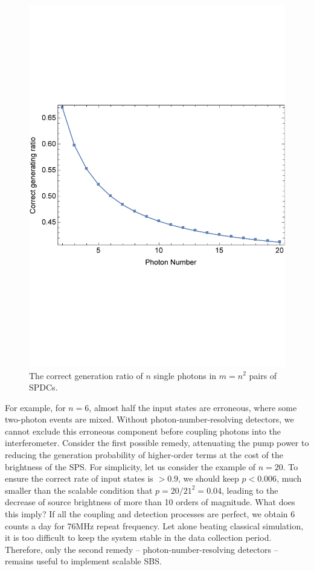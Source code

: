\documentclass[aps,rmp,twocolumn,amsmath,amssymb,nofootinbib,superscriptaddress]{revtex4}
\begin{document}
\begin{figure}[!htb]
\includegraphics[width=\columnwidth]{SBS_pair_gen}
\caption{The correct generation ratio of $n$ single photons in \mbox{$m=n^2$} pairs of SPDCs.} \label{fig:SBS_pair_gen}
\end{figure}

For example, for $n=6$, almost half the input states are erroneous, where some two-photon events are mixed. Without photon-number-resolving detectors, we cannot exclude this erroneous component before coupling photons into the interferometer. Consider the first possible remedy, attenuating the pump power to reducing the generation probability of higher-order terms at the cost of the brightness of the SPS. For simplicity, let us consider the example of $n=20$. To ensure the correct rate of input states is $>0.9$, we should keep $p<0.006$, much smaller than the scalable condition that \mbox{$p=20/21^2=0.04$}, leading to the decrease of source brightness of more than 10 orders of magnitude. What does this imply? If all the coupling and detection processes are perfect, we obtain 6 counts a day for 76MHz repeat frequency. Let alone beating classical simulation, it is too difficult to keep the system stable in the data collection period. Therefore, only the second remedy -- photon-number-resolving detectors -- remains useful to implement scalable SBS.
\end{document}
